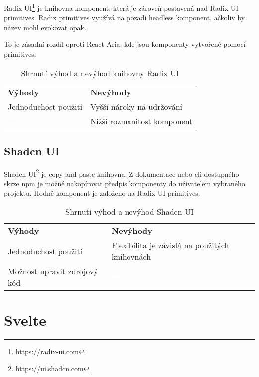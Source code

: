 Radix UI\footnote{https://radix-ui.com} je knihovna komponent, která je zároveň postavená nad Radix UI primitives.
Radix primitives využívá na pozadí headless komponent, ačkoliv by název mohl evokovat opak.

To je zásadní rozdíl oproti React Aria, kde jsou komponenty vytvořené pomocí primitives.

\begin{table}[ht]
    \begin{ctucolortab}
        \begin{tabularx}{\textwidth}{Y Y}
            \bfseries \textcolor{OK}{Výhody} & \bfseries \textcolor{NOT_OK}{Nevýhody} \\\Midrule{}
            Jednoduchost použití             & Vyšší nároky na udržování              \\
            ---                              & Nižší rozmanitost komponent
        \end{tabularx}
    \end{ctucolortab}
    \caption{Shrnutí výhod a nevýhod knihovny Radix UI}
\end{table}

\subsection{Shadcn UI}

Shadcn UI\footnote{https://ui.shadcn.com} je copy and paste knihovna.
Z dokumentace nebo \gls{cli} dostupného skrze npm je možné nakopírovat předpis komponenty do uživatelem vybraného projektu.
Hodně komponent je založeno na Radix UI primitives.

\begin{table}[ht]
    \begin{ctucolortab}
        \begin{tabularx}{\textwidth}{Y Y}
            \bfseries \textcolor{OK}{Výhody} & \bfseries \textcolor{NOT_OK}{Nevýhody}         \\\Midrule{}
            Jednoduchost použití             & Flexibilita je závislá na použitých knihovnách \\
            Možnost upravit zdrojový kód     & ---
        \end{tabularx}
    \end{ctucolortab}
    \caption{Shrnutí výhod a nevýhod Shadcn UI}
\end{table}

\section{Svelte}

